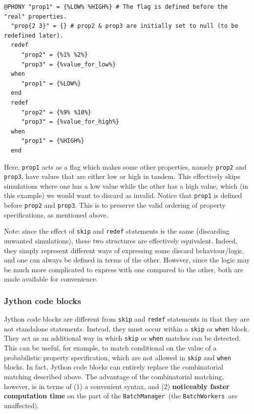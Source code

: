 \documentclass{article}
\newcommand{\BM}{{\tt BatchManager}}
\newcommand{\BWs}{{\tt BatchWorkers}}
\begin{document}
\begin{lstlisting}[]
  @PHONY "prop1" = {%LOW% %HIGH%} # The flag is defined before the "real" properties.
  "prop{2 3}" = {} # prop2 & prop3 are initially set to null (to be redefined later).
  redef
     "prop2" = {%1% %2%}
     "prop3" = {%value_for_low%}
  when
     "prop1" = {%LOW%}
  end
  redef
     "prop2" = {%9% %10%}
     "prop3" = {%value_for_high%}
  when
     "prop1" = {%HIGH%}
  end
\end{lstlisting}

Here, {\tt prop1} acts as a flag which makes some other properties, namely {\tt prop2} and {\tt prop3}, have values that are either low or high in tandem. This effectively skips simulations where one has a low value while the other has a high value, which (in this example) we would want to discard as invalid. Notice that {\tt prop1} is defined before {\tt prop2} and {\tt prop3}. This is to preserve the valid ordering of property specifications, as mentioned above.

\begin{sideblock}
Note: since the effect of {\tt skip} and {\tt redef} statements is the same (discarding unwanted simulations), these two structures are effectively equivalent. Indeed, they simply represent different ways of expressing some discard behaviour/logic, and one can always be defined in terms of the other. However, since the logic may be much more complicated to express with one compared to the other, both are made available for convenience.
\end{sideblock}

\subsubsection{Jython code blocks}

Jython code blocks are different from {\tt skip} and {\tt redef} statements in that they are not standalone statements. Instead, they must occur within a {\tt skip} or {\tt when} block. They act as an additional way in which {\tt skip} or {\tt when} matches can be detected. This can be useful, for example, to match conditional on the value of a probabilistic property specification, which are not allowed in {\tt skip} and {\tt when} blocks. In fact, Jython code blocks can entirely replace the combinatorial matching described above. The advantage of the combinatorial matching, however, is in terms of (1) a convenient syntax, and (2) \textbf{noticeably faster computation time} on the part of the \BM\ (the \BWs\ are unaffected).
\end{document}
